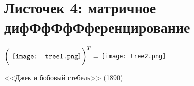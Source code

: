 
\section*{Листочек 4: матричное дифФфФфФференцирование}

\epigraph{ $\bigg(\text{ \texttt{[image: tree1.png]}} \bigg)^T = $  \texttt{[image: tree2.png]} }{<<Джек и бобовый стебель>> (1890)}



